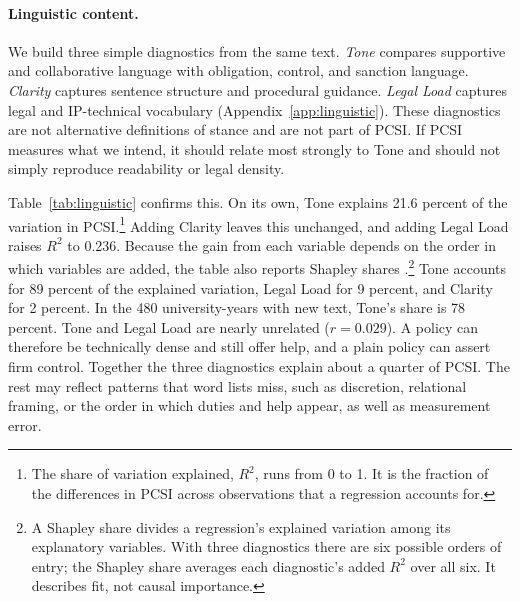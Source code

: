 \documentclass[11pt]{article}
\begin{document}
\paragraph{Linguistic content.} We build three simple diagnostics from the same text. \emph{Tone} compares supportive and collaborative language with obligation, control, and sanction language. \emph{Clarity} captures sentence structure and procedural guidance. \emph{Legal Load} captures legal and IP-technical vocabulary (Appendix~\ref{app:linguistic}). These diagnostics are not alternative definitions of stance and are not part of PCSI. If PCSI measures what we intend, it should relate most strongly to Tone and should not simply reproduce readability or legal density.

Table~\ref{tab:linguistic} confirms this. On its own, Tone explains 21.6 percent of the variation in PCSI.\footnote{The share of variation explained, $R^2$, runs from 0 to 1. It is the fraction of the differences in PCSI across observations that a regression accounts for.} Adding Clarity leaves this unchanged, and adding Legal Load raises $R^2$ to 0.236. Because the gain from each variable depends on the order in which variables are added, the table also reports Shapley shares \citep{groemping2006relative}.\footnote{A Shapley share divides a regression's explained variation among its explanatory variables. With three diagnostics there are six possible orders of entry; the Shapley share averages each diagnostic's added $R^2$ over all six. It describes fit, not causal importance.} Tone accounts for 89 percent of the explained variation, Legal Load for 9 percent, and Clarity for 2 percent. In the 480 university-years with new text, Tone's share is 78 percent. Tone and Legal Load are nearly unrelated ($r = 0.029$). A policy can therefore be technically dense and still offer help, and a plain policy can assert firm control. Together the three diagnostics explain about a quarter of PCSI. The rest may reflect patterns that word lists miss, such as discretion, relational framing, or the order in which duties and help appear, as well as measurement error.


\end{document}
